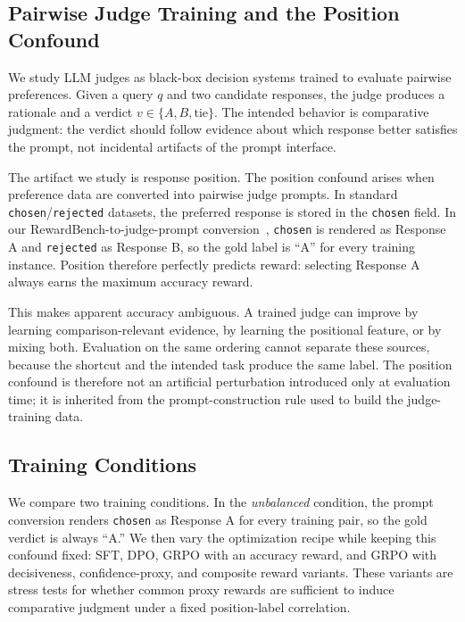\documentclass[letterpaper]{article}
\begin{document}
\subsection{Pairwise Judge Training and the Position Confound}

We study LLM judges as black-box decision systems trained to evaluate pairwise preferences. Given a query $q$ and two candidate responses, the judge produces a rationale and a verdict $v \in \{A, B, \text{tie}\}$. The intended behavior is comparative judgment: the verdict should follow evidence about which response better satisfies the prompt, not incidental artifacts of the prompt interface.

The artifact we study is response position. The position confound arises when preference data are converted into pairwise judge prompts. In standard \texttt{chosen}/\texttt{rejected} datasets, the preferred response is stored in the \texttt{chosen} field. In our RewardBench-to-judge-prompt conversion~\citep{lambert2024rewardbench}, \texttt{chosen} is rendered as Response A and \texttt{rejected} as Response B, so the gold label is ``A'' for every training instance. Position therefore perfectly predicts reward: selecting Response A always earns the maximum accuracy reward.

This makes apparent accuracy ambiguous. A trained judge can improve by learning comparison-relevant evidence, by learning the positional feature, or by mixing both. Evaluation on the same ordering cannot separate these sources, because the shortcut and the intended task produce the same label. The position confound is therefore not an artificial perturbation introduced only at evaluation time; it is inherited from the prompt-construction rule used to build the judge-training data.

\subsection{Training Conditions}

We compare two training conditions. In the \emph{unbalanced} condition, the prompt conversion renders \texttt{chosen} as Response A for every training pair, so the gold verdict is always ``A.'' We then vary the optimization recipe while keeping this confound fixed: SFT, DPO, GRPO with an accuracy reward, and GRPO with decisiveness, confidence-proxy, and composite reward variants. These variants are stress tests for whether common proxy rewards are sufficient to induce comparative judgment under a fixed position-label correlation.
\end{document}
